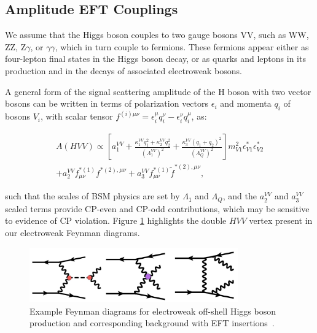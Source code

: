 \subsection{Amplitude EFT Couplings} \label{sec:amplitudeEFT}

We assume that the Higgs boson couples to two gauge bosons VV, such as WW, ZZ, Z$\gamma$, or $\gamma\gamma$, which in turn couple to fermions. These fermions appear either as four-lepton final states in the Higgs boson decay, or as quarks and leptons in its production and in the decays of associated electroweak bosons.

A general form of the signal scattering amplitude of the H boson with two vector bosons can be written in terms of polarization vectors $\epsilon_i$ and momenta $q_i$ of bosons $V_i$, with scalar tensor $f^{(i){\mu \nu}} = \epsilon_{i}^{\mu}q_{i}^{\nu} - \epsilon_{i}^\nu q_{i}^{\mu}$, as:

\begin{equation}
\label{eq:formfact-fullampl-spin0}
\begin{gathered}
A(HVV)\propto
\left[ a_{1}^{VV}
+ \frac{\kappa_1^{VV}q_{1}^2 + \kappa_2^{VV} q_{2}^{2}}{\left(\Lambda_{1}^{VV} \right)^{2}}
+ \frac{\kappa_3^{VV}(q_{1} + q_{2})^{2}}{\left(\Lambda_{Q}^{VV} \right)^{2}}
\right]
m_{V1}^2 \epsilon_{V1}^* \epsilon_{V2}^* \\
+ a_{2}^{VV}  f_{\mu \nu}^{*(1)}f^{*(2),\mu\nu}
+ a_{3}^{VV}   f^{*(1)}_{\mu \nu} {\tilde f}^{*(2),\mu\nu},
\end{gathered}
\end{equation}

such that the scales of BSM physics are set by $\Lambda_{1}$ and $\Lambda_{Q}$, and the $a_{2}^{VV}$ and $a_{3}^{VV}$ scaled terms provide CP-even and CP-odd contributions, which may be sensitive to evidence of CP violation. Figure \ref{fig:EFTdiagrams2} highlights the double $HVV$ vertex present in our electroweak Feynman diagrams.

\begin{figure}[!hbt]
\centering
\includegraphics[width=0.8\textwidth,clip] {figures/EFTdiagrams2.jpg}
\caption{Example Feynman diagrams for electroweak off-shell Higgs boson production and corresponding background with EFT insertions~\cite{offshellWGnote}.}
\label{fig:EFTdiagrams2}
\end{figure}

